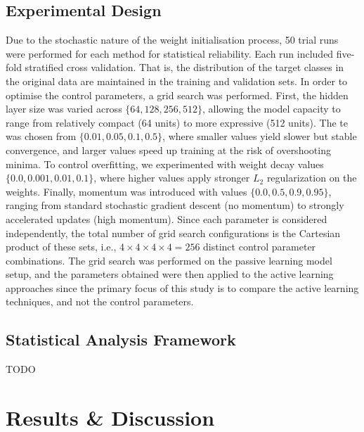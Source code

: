 \documentclass[10pt, conference]{IEEEtran}
\begin{document}
\subsection{Experimental Design}
Due to the stochastic nature of the weight initialisation process, 50 trial runs were performed for each method for statistical reliability. Each run included five-fold stratified cross validation. That is, the distribution of the target classes in the original data are maintained in the training and validation sets. In order to optimise the control parameters, a grid search was performed. First, the hidden layer size was varied across $\{64, 128, 256, 512\}$, allowing the model capacity to range from relatively compact (64 units) to more expressive (512 units). The te was chosen from  $\{0.01, 0.05, 0.1, 0.5\}$, where smaller values yield slower but stable convergence, and larger values speed up training at the risk of overshooting minima. To control overfitting, we experimented with weight decay values $\{0.0, 0.001, 0.01, 0.1\}$, where higher values apply stronger $L_2$ regularization on the weights. Finally, momentum was introduced with values $\{0.0, 0.5, 0.9, 0.95\}$, ranging from standard stochastic gradient descent (no momentum) to strongly accelerated updates (high momentum). Since each parameter is considered independently, the total number of grid search configurations is the Cartesian product of these sets, i.e., $4 \times 4 \times 4 \times 4 = 256$ distinct control parameter combinations. The grid search was performed on the passive learning model setup, and the parameters obtained were then applied to the active learning approaches since the primary focus of this study is to compare the active learning techniques, and not the control parameters.

\subsection{Statistical Analysis Framework}
TODO

\section{Results \& Discussion}
\end{document}
